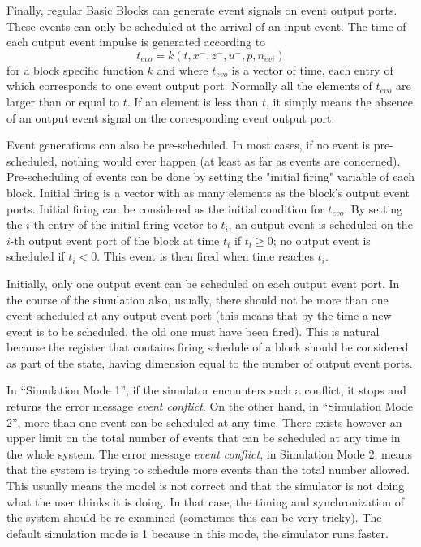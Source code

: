 Finally, regular Basic Blocks can generate event signals on event output
ports. These events can only be scheduled at the arrival of an input
event. The time of each output event impulse is generated according to
\begin{equation}
t_{evo} = k(t,x^-,z^-,u^-,p,n_{evi})  \label{e20}
\end{equation}
for a block specific function $k$ and where $t_{evo}$ is a vector of
time, each entry of which corresponds to one event output port. Normally all
the elements of $t_{evo}$ are larger than or equal to $t$. If an
element is less than $t$, it simply means the absence of an output
event signal on the corresponding event output port.

Event generations can also be pre-scheduled. In most cases, if no event
is pre-scheduled, nothing would ever happen (at least as far as events are
concerned). Pre-scheduling of events can  be done by setting the "initial 
firing" variable of each block. Initial firing is a vector with as many 
elements as the block's output event ports. Initial firing can be
considered as the initial condition for $t_{evo}$. By setting  the
$i$-th entry of the initial firing vector to $t_i$, an output event is
scheduled on the $i$-th output event port of the block at time $t_i$ if
$t_i\ge 0$; no output event is scheduled if $t_i<0$. This event is
then fired when time reaches $t_i$.

Initially, only one output event can be scheduled on each output
event port. In the course of the simulation also, usually, there should not
be more than one event scheduled at any output event port (this means
that by the time a new event is to be scheduled, the old one must have been
fired). This is natural because the register that contains firing
schedule of a block should be considered as part of the state, having
dimension equal to the number of output event ports.

In ``Simulation Mode 1'', if the simulator encounters such a 
conflict, it stops and returns the error message {\em event
conflict}. On the other hand, in ``Simulation Mode 2'', more than one
event can be scheduled at any time. There exists however an upper 
limit on the total number of events that can be scheduled at any time
in the whole system. The error message {\it event conflict},
in Simulation Mode 2, means that the system is trying to schedule more
events than the total number allowed. This usually means the model is
not correct and that the simulator is not doing what the user thinks
it is doing. In that case, the timing and synchronization of the
system should be re-examined (sometimes this can be very tricky). The
default simulation mode is 1 because in this mode, the simulator runs faster. 

